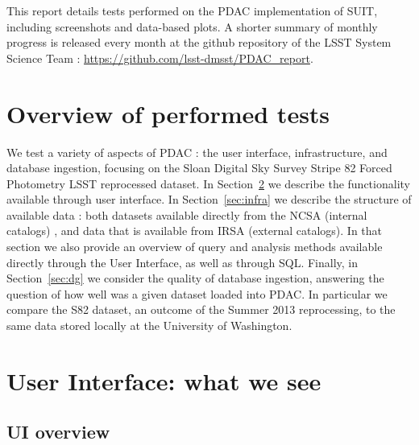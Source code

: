\documentclass[DM,lsstdraft,toc]{lsstdoc}
\begin{document}
This report details tests performed on the PDAC implementation of SUIT, including screenshots and data-based plots.  A shorter summary of monthly progress is released every month at the github repository of the LSST System Science Team : \url{https://github.com/lsst-dmsst/PDAC_report}.




\section{Overview of performed tests}

We test a variety of aspects of PDAC : the user interface, infrastructure, and database ingestion, focusing on the Sloan Digital Sky Survey Stripe 82 Forced Photometry LSST reprocessed dataset. In Section~\ref{sec:ui} we describe the functionality available through user interface. In Section~\ref{sec:infra} we describe the structure of  available data : both datasets available directly from the NCSA (internal catalogs) , and data that is available from IRSA (external catalogs).  In that section we also provide an overview of query and analysis methods available directly through the User Interface,  as well as through SQL.  Finally, in Section~\ref{sec:dg} we consider the quality of database ingestion, answering the question of how well was a given dataset loaded into PDAC. In particular we compare the S82 dataset, an outcome of the Summer 2013 reprocessing, to the same data stored locally at the University of Washington.



\section{User Interface: what we see}
\label{sec:ui}
\subsection{UI overview}
\end{document}
